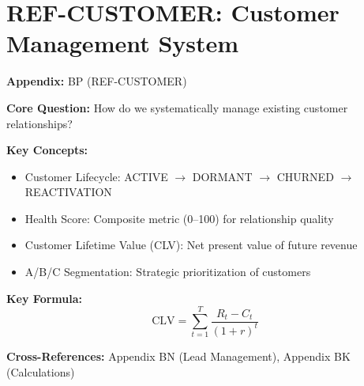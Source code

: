 \chapter{REF-CUSTOMER: Customer Management System}
\label{app:customer-management}

\begin{abstract}
This appendix documents the Customer Management System for FehrAdvice \& Partners AG.
It provides the complete specification for managing existing customer relationships,
including lifecycle management (ACTIVE $\rightarrow$ DORMANT $\rightarrow$ CHURNED),
relationship health tracking, project management, and revenue/CLV calculations.
The system integrates with the Lead Management System (Appendix BN) to provide
end-to-end client lifecycle coverage from initial lead to long-term customer.
\end{abstract}

\begin{tcolorbox}[colback=blue!5!white, colframe=blue!75!black,
    title=Quick Reference: Customer Management System]

\textbf{Appendix:} BP (REF-CUSTOMER)

\textbf{Core Question:} How do we systematically manage existing customer relationships?

\textbf{Key Concepts:}
\begin{itemize}[nosep]
\item Customer Lifecycle: ACTIVE $\rightarrow$ DORMANT $\rightarrow$ CHURNED $\rightarrow$ REACTIVATION
\item Health Score: Composite metric (0--100) for relationship quality
\item Customer Lifetime Value (CLV): Net present value of future revenue
\item A/B/C Segmentation: Strategic prioritization of customers
\end{itemize}

\textbf{Key Formula:}
\begin{equation}
\text{CLV} = \sum_{t=1}^{T} \frac{R_t - C_t}{(1+r)^t}
\end{equation}

\textbf{Cross-References:} Appendix BN (Lead Management), Appendix BK (Calculations)
\end{tcolorbox}

